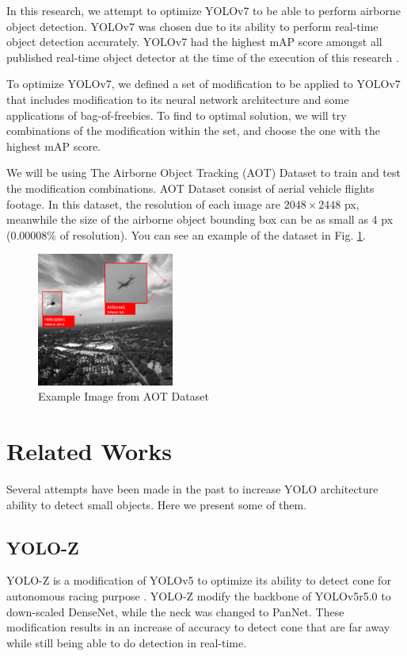 \documentclass[conference]{IEEEtran}
\begin{document}
In this research, we attempt to optimize YOLOv7 to be able to perform airborne
object detection. YOLOv7 was chosen due to its ability to perform real-time
object detection accurately. YOLOv7 had the highest mAP score amongst all
published real-time object detector at the time of the execution of this research \cite{yolov7}.

To optimize YOLOv7, we defined a set of modification to be applied to YOLOv7
that includes modification to its neural network architecture and some applications
of bag-of-freebies. To find to optimal solution, we will try combinations of
the modification within the set, and choose the one with the highest mAP score.

We will be using The Airborne Object Tracking (AOT) Dataset \cite{aot_dataset} to train
and test the modification combinations. AOT Dataset consist of aerial vehicle flights
footage. In this dataset, the resolution of each image are $2048\times2448$ px, meanwhile
the size of the airborne object bounding box can be as small as 4 px (0.00008\% of resolution).
You can see an example of the dataset in Fig. \ref{fig:airborne-example}.
\begin{figure}[htbp]
\centerline{\includegraphics[width=0.4\textwidth]{../book/figures/dataset-example-labeled.png}}
\caption{Example Image from AOT Dataset \cite{aot_docs}}
\label{fig:airborne-example}
\end{figure}

\section{Related Works}
Several attempts have been made in the past to increase YOLO architecture ability
to detect small objects. Here we present some of them.
\subsection{YOLO-Z}
YOLO-Z is a modification of YOLOv5 to optimize its ability to detect
cone for autonomous racing purpose \cite{yoloz}.
YOLO-Z modify the backbone of YOLOv5r5.0 to down-scaled DenseNet, while
the neck was changed to PanNet.
These modification results in an increase of accuracy to detect cone
that are far away while still being able to do detection in real-time.
\end{document}
